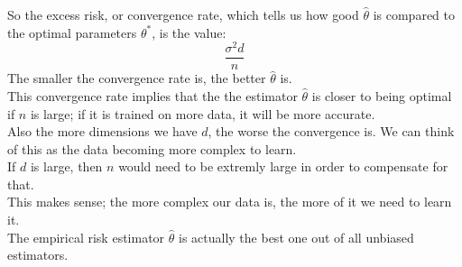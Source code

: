\documentclass[12pt]{article}
\begin{document}
So the excess risk, or convergence rate,
which tells us how good $\hat{\theta}$
is compared to the optimal parameters $\theta^*$,
is the value:
\[ \dfrac{\sigma^2 d}{n} \]
The smaller the convergence rate is,
the better $\hat{\theta}$ is. \\

This convergence rate implies that the
the estimator $\hat{\theta}$
is closer to being optimal if $n$ is large;
if it is trained on more data, 
it will be more accurate. \\

Also the more dimensions we have $d$,
the worse the convergence is.
We can think of this as the data becoming
more complex to learn. \\
If $d$ is large, then $n$ would need to be extremly
large in order to compensate for that. \\
This makes sense; the more complex our data is,
the more of it we need to learn it. \\

The empirical risk estimator
$\hat{\theta}$ is actually the best
one out of all unbiased estimators. \\



\newpage
\end{document}
